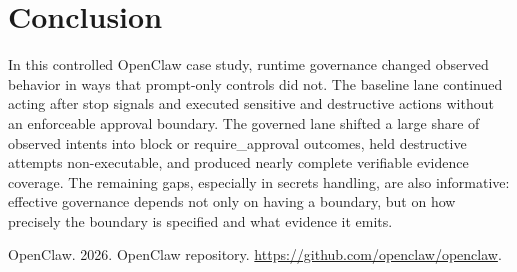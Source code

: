 \documentclass[letterpaper]{article}
\begin{document}
\section{Conclusion}

In this controlled OpenClaw case study, runtime governance changed observed behavior in ways that prompt-only controls did not. The baseline lane continued acting after stop signals and executed sensitive and destructive actions without an enforceable approval boundary. The governed lane shifted a large share of observed intents into block or require\_approval outcomes, held destructive attempts non-executable, and produced nearly complete verifiable evidence coverage. The remaining gaps, especially in secrets handling, are also informative: effective governance depends not only on having a boundary, but on how precisely the boundary is specified and what evidence it emits.

\begin{thebibliography}{}

OpenClaw. 2026.
\newblock OpenClaw repository.
\newblock \url{https://github.com/openclaw/openclaw}.

\end{thebibliography}
\end{document}
